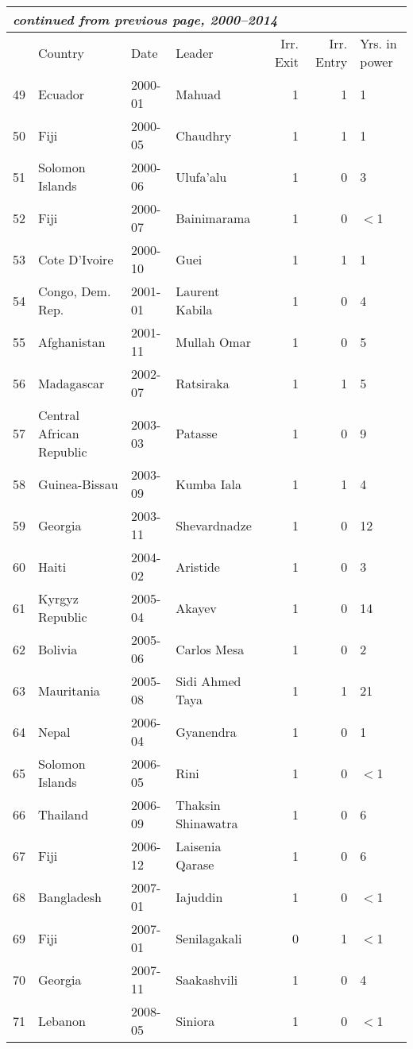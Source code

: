 \documentclass[pdftex,11pt]{article}
\begin{document}
\begin{table*}
\centering \small
\begin{tabular}{rlllrrl}
\multicolumn{7}{l}{\textit{continued from previous page, 2000--2014}} \\
\midrule
 & Country & Date & Leader & Irr. Exit & Irr. Entry & Yrs. in power \\ 
  \midrule
  49 & Ecuador & 2000-01 & Mahuad & 1 & 1 & 1 \\ 
  50 & Fiji & 2000-05 & Chaudhry & 1 & 1 & 1 \\ 
  51 & Solomon Islands & 2000-06 & Ulufa'alu & 1 & 0 & 3 \\ 
  52 & Fiji & 2000-07 & Bainimarama & 1 & 0 & $<$1 \\ 
  53 & Cote D'Ivoire & 2000-10 & Guei & 1 & 1 & 1 \\ 
  54 & Congo, Dem. Rep. & 2001-01 & Laurent Kabila & 1 & 0 & 4 \\ 
  55 & Afghanistan & 2001-11 & Mullah Omar & 1 & 0 & 5 \\ 
  56 & Madagascar & 2002-07 & Ratsiraka & 1 & 1 & 5 \\ 
  57 & Central African Republic & 2003-03 & Patasse & 1 & 0 & 9 \\ 
  58 & Guinea-Bissau & 2003-09 & Kumba Iala & 1 & 1 & 4 \\ 
  59 & Georgia & 2003-11 & Shevardnadze & 1 & 0 & 12 \\ 
  60 & Haiti & 2004-02 & Aristide & 1 & 0 & 3 \\ 
  61 & Kyrgyz Republic & 2005-04 & Akayev & 1 & 0 & 14 \\ 
  62 & Bolivia & 2005-06 & Carlos Mesa & 1 & 0 & 2 \\ 
  63 & Mauritania & 2005-08 & Sidi Ahmed Taya & 1 & 1 & 21 \\ 
  64 & Nepal & 2006-04 & Gyanendra & 1 & 0 & 1 \\ 
  65 & Solomon Islands & 2006-05 & Rini & 1 & 0 & $<$1 \\ 
  66 & Thailand & 2006-09 & Thaksin Shinawatra & 1 & 0 & 6 \\ 
  67 & Fiji & 2006-12 & Laisenia Qarase & 1 & 0 & 6 \\ 
  68 & Bangladesh & 2007-01 & Iajuddin & 1 & 0 & $<$1 \\ 
  69 & Fiji & 2007-01 & Senilagakali & 0 & 1 & $<$1 \\ 
  70 & Georgia & 2007-11 & Saakashvili & 1 & 0 & 4 \\ 
  71 & Lebanon & 2008-05 & Siniora & 1 & 0 & $<$1 \\ 

\end{tabular}
\end{table*}
\end{document}
